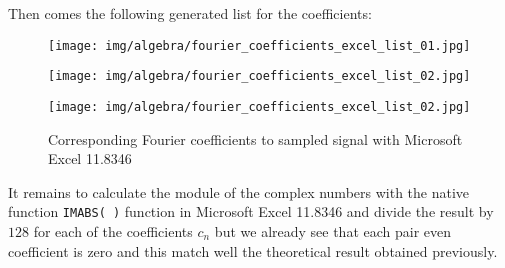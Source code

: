 	Then comes the following generated list for the coefficients:
	\begin{figure}[H]
		\centering
		\texttt{[image: img/algebra/fourier\_coefficients\_excel\_list\_01.jpg]}
	\end{figure}
	\begin{figure}[H]
		\centering
		\texttt{[image: img/algebra/fourier\_coefficients\_excel\_list\_02.jpg]}
	\end{figure}
	\begin{figure}[H]
		\centering
		\texttt{[image: img/algebra/fourier\_coefficients\_excel\_list\_02.jpg]}
		\caption[]{Corresponding Fourier coefficients to sampled signal with Microsoft Excel 11.8346}
	\end{figure}
	It remains to calculate the module of the complex numbers with the native function  \texttt{IMABS( )} function in Microsoft Excel 11.8346 and divide the result by $128$ for each of the coefficients $c_n$ but we already see that each pair even coefficient  is zero and this match well the theoretical result obtained previously.
	
